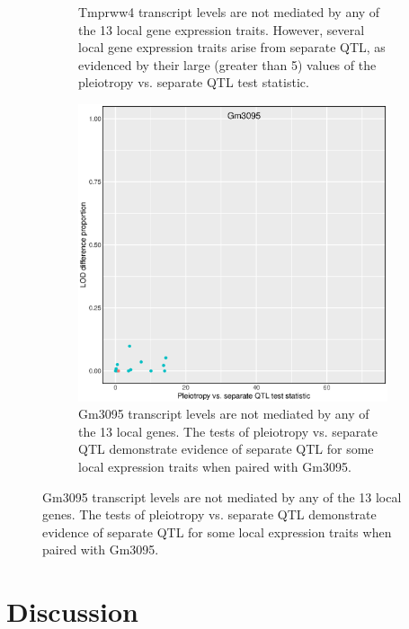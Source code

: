 \documentclass{article}
\begin{document}
\begin{boehm}
\begin{figure}
\begin{subfigure}[t]{.45\textwidth}
        \caption{Tmprww4 transcript levels are not mediated by any of the 13 local gene expression traits. However, several local gene expression traits arise from separate QTL, as evidenced by their large (greater than 5) values of the pleiotropy vs. separate QTL test statistic.}
    \end{subfigure}
    \begin{subfigure}[t]{.45\textwidth}
        \includegraphics[width = \textwidth]{../Rmd/nonlocal-scatter_141.eps}
        \caption{Gm3095 transcript levels are not mediated by any of the 13 local genes. The tests of pleiotropy vs. separate QTL demonstrate evidence of separate QTL for some local expression traits when paired with Gm3095.}
    \end{subfigure}
    \label{fig:4nonlocal}
\end{figure}





\section{Discussion}


\end{boehm}
\end{document}
